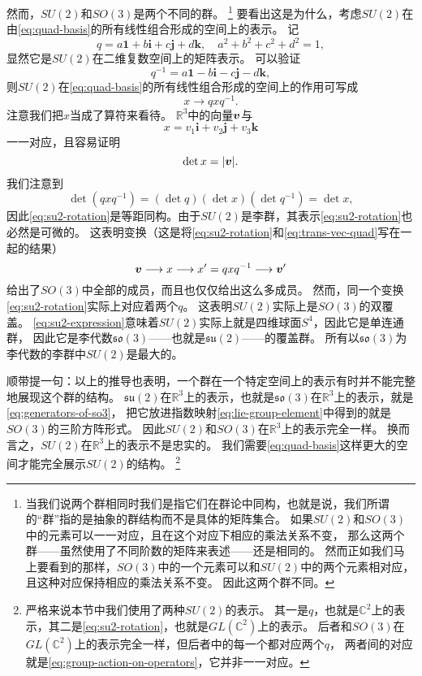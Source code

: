 \documentclass[hyperref, UTF8, a4paper]{ctexart}
\newcommand*{\reals}{\mathbb{R}}
\newcommand*{\complexes}{\mathbb{C}}
\begin{document}
然而，$SU(2)$和$SO(3)$是两个不同的群。%
\footnote{当我们说两个群相同时我们是指它们在群论中同构，也就是说，我们所谓的“群”指的是抽象的群结构而不是具体的矩阵集合。
如果$SU(2)$和$SO(3)$中的元素可以一一对应，且在这个对应下相应的乘法关系不变，
那么这两个群——虽然使用了不同阶数的矩阵来表述——还是相同的。
然而正如我们马上要看到的那样，$SO(3)$中的一个元素可以和$SU(2)$中的两个元素相对应，且这种对应保持相应的乘法关系不变。
因此这两个群不同。}%
要看出这是为什么，考虑$SU(2)$在由\eqref{eq:quad-basis}的所有线性组合形成的空间上的表示。
记
\[
    q = a \mathbf{1} + b \mathbf{i} + c \mathbf{j} + d \mathbf{k}, \quad a^2 + b^2 + c^2 + d^2 = 1,
\]
显然它是$SU(2)$在二维复数空间上的矩阵表示。
可以验证
\[
    q^{-1} = a \mathbf{1} - b \mathbf{i} - c \mathbf{j} - d \mathbf{k},
\]
则$SU(2)$在\eqref{eq:quad-basis}的所有线性组合形成的空间上的作用可写成
\begin{equation}
    x \longrightarrow q x q^{-1}.
    \label{eq:su2-rotation}
\end{equation}
注意我们把$x$当成了算符来看待。
$\reals^3$中的向量$\vb*{v}$与
\begin{equation}
    x = v_1 \mathbf{i} + v_2 \mathbf{j} + v_3 \mathbf{k}
    \label{eq:trans-vec-quad}
\end{equation}
一一对应，且容易证明
\[
    \det x = \abs{\vb*{v}}.
\]
我们注意到
\[
    \det (q x q^{-1}) = (\det q) (\det x) (\det q^{-1}) = \det x,
\]
因此\eqref{eq:su2-rotation}是等距同构。由于$SU(2)$是李群，其表示\eqref{eq:su2-rotation}也必然是可微的。
这表明变换（这是将\eqref{eq:su2-rotation}和\eqref{eq:trans-vec-quad}写在一起的结果）
\[
    \vb*{v} \longrightarrow x \longrightarrow x' = q x q^{-1} \longrightarrow \vb*{v}'
\]
给出了$SO(3)$中全部的成员，而且也仅仅给出这么多成员。
然而，同一个变换\eqref{eq:su2-rotation}实际上对应着两个$q$。
这表明$SU(2)$实际上是$SO(3)$的双覆盖。
\eqref{eq:su2-expression}意味着$SU(2)$实际上就是四维球面$S^4$，因此它是单连通群，
因此它是李代数$\mathfrak{so}(3)$——也就是$\mathfrak{su}(2)$——的覆盖群。
所有以$\mathfrak{so}(3)$为李代数的李群中$SU(2)$是最大的。

顺带提一句：以上的推导也表明，一个群在一个特定空间上的表示有时并不能完整地展现这个群的结构。
$\mathfrak{su}(2)$在$\reals^3$上的表示，也就是$\mathfrak{so}(3)$在$\reals^3$上的表示，就是\eqref{eq:generators-of-so3}，
把它放进指数映射\eqref{eq:lie-group-element}中得到的就是$SO(3)$的三阶方阵形式。
因此$SU(2)$和$SO(3)$在$\reals^3$上的表示完全一样。
换而言之，$SU(2)$在$\reals^3$上的表示不是忠实的。
我们需要\eqref{eq:quad-basis}这样更大的空间才能完全展示$SU(2)$的结构。%
\footnote{严格来说本节中我们使用了两种$SU(2)$的表示。
其一是$q$，也就是$\complexes^2$上的表示，其二是\eqref{eq:su2-rotation}，也就是$GL(\complexes^2)$上的表示。
后者和$SO(3)$在$GL(\complexes^2)$上的表示完全一样，但后者中的每一个都对应两个$q$，
两者间的对应就是\eqref{eq:group-action-on-operators}，它并非一一对应。}
\end{document}
